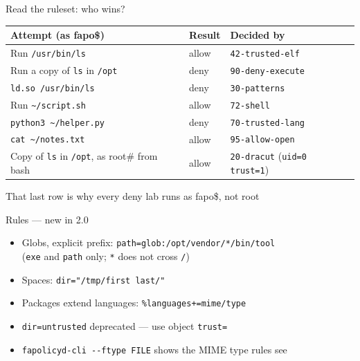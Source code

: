 \documentclass[aspectratio=169,11pt]{beamer}
\newcommand{\ok}[1]{\textcolor{allowc}{#1}}
\newcommand{\no}[1]{\textcolor{denyc}{#1}}
\newcommand{\rootp}{\textcolor{rootc}{root\#}}
\newcommand{\fapop}{\textcolor{fapoc}{fapo\$}}
\newcommand{\dd}{-{}-}
\begin{document}
\begin{frame}{Read the ruleset: who wins?}
  \small
  \begin{tabular}{@{}p{6.8cm}ll@{}}
    \toprule
    Attempt (as \fapop) & Result & Decided by \\
    \midrule
    Run \texttt{/usr/bin/ls} & \ok{allow} & \texttt{42-trusted-elf} \\
    Run a copy of \texttt{ls} in \texttt{/opt} & \no{deny} & \texttt{90-deny-execute} \\
    \texttt{ld.so /usr/bin/ls} & \no{deny} & \texttt{30-patterns} \\
    Run \texttt{\textasciitilde/script.sh} & \ok{allow} & \texttt{72-shell} \\
    \texttt{python3 \textasciitilde/helper.py} & \no{deny} & \texttt{70-trusted-lang} \\
    \texttt{cat \textasciitilde/notes.txt} & \ok{allow} & \texttt{95-allow-open} \\
    \midrule
    Copy of \texttt{ls} in \texttt{/opt}, as \rootp{} from bash & \ok{allow} & \texttt{20-dracut} (\texttt{uid=0 trust=1}) \\
    \bottomrule
  \end{tabular}

  \vspace{0.6em}
  That last row is why every deny lab runs as \fapop, not root
\end{frame}

\begin{frame}{Rules --- new in 2.0}
  \begin{itemize}
    \item Globs, explicit prefix: \texttt{path=glob:/opt/vendor/*/bin/tool}\\
          {\small (\texttt{exe} and \texttt{path} only; \texttt{*} does not cross \texttt{/})}
    \item Spaces: \texttt{dir="/tmp/first last/"}
    \item Packages extend languages: \texttt{\%languages+=mime/type}
    \item \texttt{dir=untrusted} deprecated --- use object \texttt{trust=}
    \item \texttt{fapolicyd-cli \dd ftype FILE} shows the MIME type rules see
  \end{itemize}
\end{frame}
\end{document}
